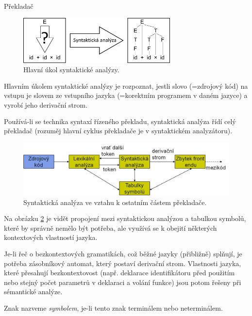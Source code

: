 \begin{definiceN}{Překladač}
\begin{figure}[h]
	\centering
	\includegraphics[width=8cm]{i2/softwarove_inzenyrstvi/obrazky/Syntakticka_analyza.pdf}
	\caption{Hlavní úkol syntaktické analýzy.}
	\label{pic:Syntakticka_analyza}
\end{figure}

Hlavním úkolem syntaktické analýzy je rozpoznat, jestli slovo (=zdrojový kód) na vstupu je slovem ze vstupního jazyka (=korektním programem v daném jazyce) a vyrobí jeho derivační strom.

Používá-li se technika syntaxí řízeného překladu, syntaktická analýza řídí celý překladač (rozuměj hlavní cyklus překladače je v syntaktickém analyzátoru).

\begin{figure}[h]
	\centering
	\includegraphics[width=13cm]{i2/softwarove_inzenyrstvi/obrazky/Syntakticka_analyza_v_prekladaci.png}
	\caption{Syntaktická analýza ve vztahu k ostatním částem překladače.}
	\label{pic:Syntakticka_analyza_v_prekladaci}
\end{figure}

Na obrázku \ref{pic:Syntakticka_analyza_v_prekladaci} je vidět propojení mezi syntaktickou analýzou a tabulkou symbolů, které by správně nemělo být potřeba, ale využívá se k obejití některých kontextových vlastností jazyka.

Je-li řeč o bezkontextových gramatikách, což běžné jazyky (přibližně) splňují, je potřeba zásobníkový automat, který postaví derivační strom. Vlastnosti jazyka, které přesahují bezkontextovost (např. deklarace identifikátoru před použitím nebo stejný počet parametrů v deklaraci a volání funkce) jsou potom řešeny při sémantické analýze.

\begin{definice}
	Znak nazveme \emph{symbolem}, je-li tento znak terminálem nebo neterminálem.
\end{definice}



\end{definiceN}
